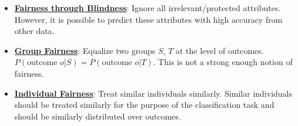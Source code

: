 \documentclass{article}%
\begin{document}
\begin{itemize}[leftmargin=*]%
\item \href{https://purdue.brightspace.com/d2l/common/assets/pdfjs-d2l-dist/1.0.14-legacy/web/viewer.html?file=\%2Fcontent\%2Fenforced\%2F1095467-wl.202510.CS.24300.001\%2F16L2-ethics.pdf\%3Fou\%3D1095467\&lang=en-us\&container=d2l-fileviewer-rendered-pdf\&fullscreen=d2l-fileviewer-rendered-pdf-dialog\&height=667#page=25}{\textbf{Fairness through Blindness}}: Ignore all irrelevant/protected attributes. However, it is possible to predict these attributes with high accuracy from other data.%
\item \href{https://purdue.brightspace.com/d2l/common/assets/pdfjs-d2l-dist/1.0.14-legacy/web/viewer.html?file=\%2Fcontent\%2Fenforced\%2F1095467-wl.202510.CS.24300.001\%2F16L2-ethics.pdf\%3Fou\%3D1095467\&lang=en-us\&container=d2l-fileviewer-rendered-pdf\&fullscreen=d2l-fileviewer-rendered-pdf-dialog\&height=667#page=26}{\textbf{Group Fairness}}: Equalize two groups $S$, $T$ at the level of outcomes. $P(\text{outcome } o | S) = P(\text{outcome } o | T)$. This is not a strong enough notion of fairness.%
\item \href{https://purdue.brightspace.com/d2l/common/assets/pdfjs-d2l-dist/1.0.14-legacy/web/viewer.html?file=\%2Fcontent\%2Fenforced\%2F1095467-wl.202510.CS.24300.001\%2F16L2-ethics.pdf\%3Fou\%3D1095467\&lang=en-us\&container=d2l-fileviewer-rendered-pdf\&fullscreen=d2l-fileviewer-rendered-pdf-dialog\&height=667#page=27}{\textbf{Individual Fairness}}: Treat similar individuals similarly. Similar individuals should be treated similarly for the purpose of the classification task and should be similarly distributed over outcomes.%
\end{itemize}

%
\end{document}
